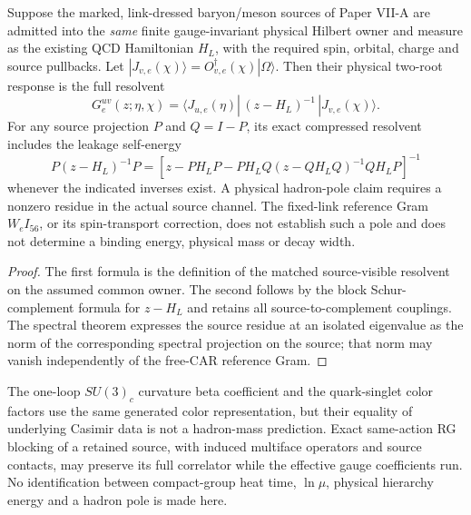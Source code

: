 \documentclass[12pt,a4paper]{article}
\begin{document}
\begin{proposition}
\label{p11:prop:v3023-mobile-2i-pole-interface}
Suppose the marked, link-dressed baryon/meson sources of Paper VII-A
are admitted into the \emph{same} finite gauge-invariant physical
Hilbert owner and measure as the existing QCD Hamiltonian $H_L$,
with the required spin, orbital, charge and source pullbacks. Let
$|J_{v,e}(\chi)\rangle=O_{v,e}^\dagger(\chi)|\Omega\rangle$.
Then their physical two-root response is the full resolvent
\[
\boxed{G_e^{uv}(z;\eta,\chi)=
\langle J_{u,e}(\eta)|\,(z-H_L)^{-1}\,
|J_{v,e}(\chi)\rangle.}
\]
For any source projection $P$ and $Q=I-P$, its exact compressed
resolvent includes the leakage self-energy
\[
\boxed{P(z-H_L)^{-1}P=
 [z-PH_LP-PH_LQ(z-QH_LQ)^{-1}QH_LP]^{-1}}
\]
whenever the indicated inverses exist. A physical hadron-pole claim
requires a nonzero residue in the actual source channel. The fixed-link
reference Gram $W_eI_{56}$, or its spin-transport correction, does
not establish such a pole and does not determine a binding energy,
physical mass or decay width.
\end{proposition}
\begin{proof}
The first formula is the definition of the matched source-visible
resolvent on the assumed common owner. The second follows by the
block Schur-complement formula for $z-H_L$ and retains all
source-to-complement couplings. The spectral theorem expresses the
source residue at an isolated eigenvalue as the norm of the
corresponding spectral projection on the source; that norm may
vanish independently of the free-CAR reference Gram.
\end{proof}

\begin{remark}
\label{p11:rem:v3023-beta-hadron-source-firewall}
The one-loop $SU(3)_c$ curvature beta coefficient and the
quark-singlet color factors use the same generated color
representation, but their equality of underlying Casimir data
is not a hadron-mass prediction. Exact same-action RG blocking of a
retained source, with induced multiface operators and source contacts,
may preserve its full correlator while the effective gauge coefficients
run. No identification between compact-group heat time, $\ln\mu$,
physical hierarchy energy and a hadron pole is made here.
\end{remark}


\end{document}
